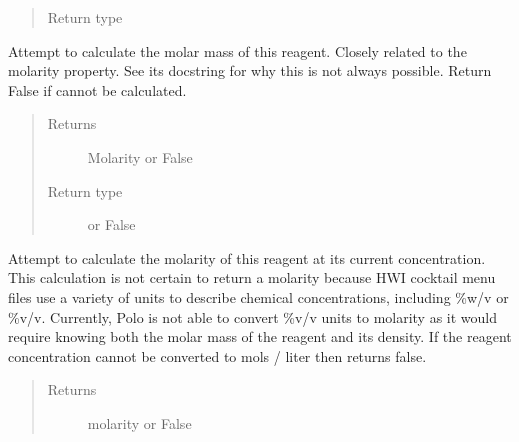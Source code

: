 \documentclass[letterpaper,10pt,english]{sphinxmanual}
\begin{document}
\begin{fulllineitems}
\begin{fulllineitems}
\begin{quote}
\begin{description}
\item[{Return type}] \leavevmode
{\hyperref[\detokenize{polo.crystallography:polo.crystallography.cocktail.SignedValue}]{}}

\end{description}\end{quote}

\end{fulllineitems}


\begin{fulllineitems}
\label{\detokenize{polo.crystallography:polo.crystallography.cocktail.Reagent.molar_mass}}
Attempt to calculate the molar mass of this reagent. Closely related
to the molarity property. See its docstring for why this is not always
possible. Return False if cannot be calculated.
\begin{quote}\begin{description}
\item[{Returns}] \leavevmode
Molarity or False

\item[{Return type}] \leavevmode
{\hyperref[\detokenize{polo.crystallography:polo.crystallography.cocktail.SignedValue}]{}} or False

\end{description}\end{quote}

\end{fulllineitems}


\begin{fulllineitems}
\label{\detokenize{polo.crystallography:polo.crystallography.cocktail.Reagent.molarity}}
Attempt to calculate the molarity of this reagent at its current
concentration. This calculation is not certain to return a molarity
because HWI cocktail menu files use a variety of units to describe
chemical concentrations, including \%w/v or \%v/v. Currently, Polo is
not able to convert \%v/v units to molarity as it would require knowing
both the molar mass of the reagent and its density. If the reagent
concentration cannot be converted to mols / liter then returns false.
\begin{quote}\begin{description}
\item[{Returns}] \leavevmode
molarity or False


\end{description}
\end{quote}
\end{fulllineitems}
\end{fulllineitems}
\end{document}
